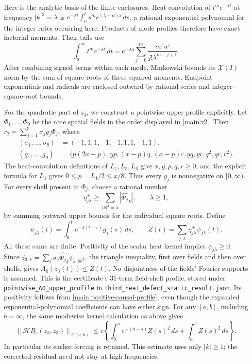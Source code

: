 Here is the analytic basis of the finite enclosures. Heat convolution of
$t^m e^{-\alpha t}$ at frequency $|k|^2=\lambda$ is
$e^{-\lambda t}\int_0^t s^m e^{(\lambda-\alpha)s}\,ds$, a rational
exponential polynomial for the integer rates occurring here. Products of
mode profiles therefore have exact factorial moments. Their tails use
\begin{equation}
 \int_a^\infty t^m e^{-\lambda t}\,dt
 =e^{-\lambda a}\sum_{j=0}^m
       \frac{m!\,a^j}{j!\lambda^{m-j+1}}.\label{main:moments}
\end{equation}
After combining signed terms within each mode, Minkowski bounds its
$\mathcal X(I)$ norm by the sum of square roots of these squared moments.
Endpoint exponentials and radicals are enclosed outward by rational
series and integer-square-root bounds.

For the quadratic part of $z_4$, we construct a pointwise upper profile
explicitly. Let $\Phi_1,\ldots,\Phi_9$ be the nine spatial fields in the
order displayed in \eqref{main:r2}. Then
$r_2=\sum_{j=1}^9\sigma_j g_j\Phi_j$, where
\begin{align}
 (\sigma_1,\ldots,\sigma_9)&=(-1,1,1,-1,-1,1,1,-1,1),\nonumber\\
 (g_1,\ldots,g_9)&=\bigl(p(2x-p),yp,(x-p)q,(x-p)r,
                  yq,yr,q^2,qr,r^2\bigr).
 \label{main:positive-forcing}
\end{align}
The heat-convolution definitions of $L_1,L_5,L_6$ give
$x,y,p,q,r\ge0$, and the explicit formula for $L_1$ gives
$0\le p=L_1/2\le x/8$. Thus every $g_j$ is nonnegative on
$[0,\infty)$. For every shell present in $\Phi_j$, choose a rational
number
\[
 \eta^+_{j\lambda}\ge
 \sum_{|k|^2=\lambda}|\widehat{\Phi_j}_k|,
 \qquad \lambda\ge1,
\]
by summing outward upper bounds for the individual square roots. Define
\begin{equation}
 \psi_{j\lambda}(t)=\int_0^t e^{-\lambda(t-s)}g_j(s)\,ds,
 \qquad
 Z(t)=\sum_{j,\lambda}\eta^+_{j\lambda}\psi_{j\lambda}(t).
 \label{main:positive-causal-profile}
\end{equation}
All these sums are finite. Positivity of the scalar heat kernel implies
$\psi_{j\lambda}\ge0$. Since
$\widehat z_{3,k}=\sum_j\sigma_j\widehat{\Phi_j}_k
\psi_{j,|k|^2}$, the triangle inequality, first over fields and then over
shells, gives $A_0(z_3(t))\le Z(t)$. No disjointness of the fields' Fourier
supports is assumed. This is the certificate's 31-term field-shell
profile, stored under \texttt{pointwise\_A0\_upper\_profile} in
\nolinkurl{third_heat_defect_static_result.json}. Its positivity follows
from \eqref{main:positive-causal-profile}, even though the expanded
exponential-polynomial coefficients can have either sign.
For any $[a,b]$, including
$b=\infty$, the same modewise kernel calculation as above gives
\begin{equation}
 \|\mathcal H B_s(z_3,z_3)\|_{\mathcal X(a,b)}
 \le c\left\{\int_0^a e^{-(a-s)}Z(s)^2\,ds
                 +\int_a^b Z(s)^2\,ds\right\}.\label{main:quadratic-history}
\end{equation}
In particular its earlier forcing is retained. This estimate uses only
$|k|\ge1$; the corrected residual need not stay at high frequencies.

